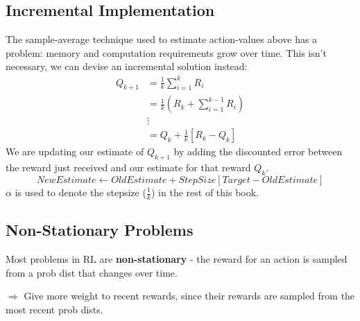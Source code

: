
\subsection{Incremental Implementation}
The sample-average technique used to estimate action-values above has a problem: memory and computation requirements grow over time. This isn't necessary, we can devise an incremental solution instead:
\begin{align}
Q_{k+1} &= \frac{1}{k} \sum_{i=1}^{k} R_i \\
&= \frac{1}{k} \left( R_k + \sum_{i=1}^{k-1} R_i \right) \\
&\vdots \nonumber \\
&= Q_k + \frac{1}{k} [R_k - Q_k]
\end{align}
We are updating our estimate of $Q_{k+1}$ by adding the discounted error between the reward just received and our estimate for that reward $Q_k$.
\begin{equation}
\textit{NewEstimate} \leftarrow \textit{OldEstimate} + \textit{StepSize} [\textit{Target} - \textit{OldEstimate}]
\label{eq:incremental_update}
\end{equation}
$\alpha$ is used to denote the stepsize ($\frac{1}{k}$) in the rest of this book.






\subsection{Non-Stationary Problems}

Most problems in RL are \textbf{non-stationary} - the reward for an action is sampled from a prob dist that changes over time.

$\Rightarrow$ Give more weight to recent rewards, since their rewards are sampled from the most recent prob dists.

